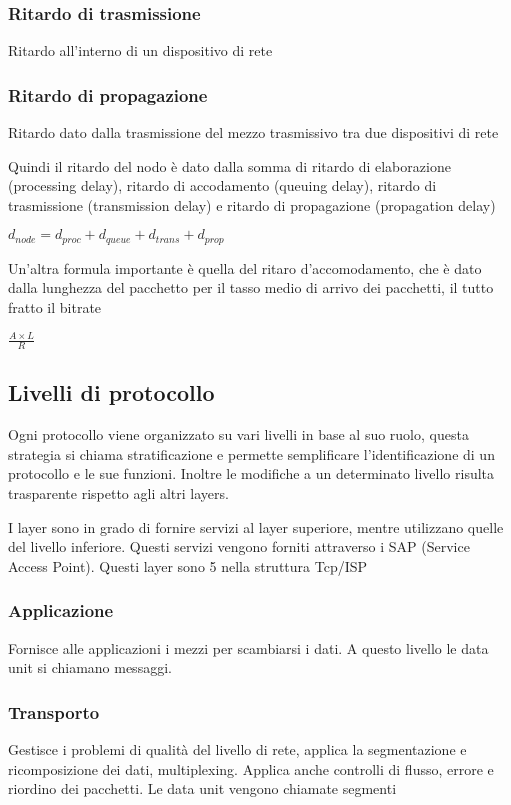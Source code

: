 \documentclass[12pt, a4paper]{article}
\begin{document}
\subsubsection*{Ritardo di trasmissione}
Ritardo all'interno di un dispositivo di rete

\subsubsection*{Ritardo di propagazione}
Ritardo dato dalla trasmissione del mezzo trasmissivo tra due dispositivi di rete


Quindi il ritardo del nodo è dato dalla somma di ritardo di elaborazione (processing delay), ritardo di accodamento 
(queuing delay), ritardo di trasmissione (transmission delay) e ritardo di propagazione (propagation delay)
\begin{center}
    $d_{node}=d_{proc}+d_{queue}+d_{trans}+d_{prop}$
\end{center}

Un'altra formula importante è quella del ritaro d'accomodamento, che è dato dalla lunghezza del pacchetto per il tasso 
medio di arrivo dei pacchetti, il tutto fratto il bitrate
\begin{center}
    $\frac{A\times L}{R}$
\end{center}

\subsection{Livelli di protocollo}
Ogni protocollo viene organizzato su vari livelli in base al suo ruolo, questa strategia si chiama stratificazione e 
permette semplificare l'identificazione di un protocollo e le sue funzioni. Inoltre le modifiche a un determinato 
livello risulta trasparente rispetto agli altri layers.

I layer sono in grado di fornire servizi al layer superiore, mentre utilizzano quelle del livello inferiore. Questi 
servizi vengono forniti attraverso i SAP (Service Access Point). Questi layer sono 5 nella struttura Tcp/ISP

\subsubsection*{Applicazione}
Fornisce alle applicazioni i mezzi per scambiarsi i dati. A questo livello le data unit si chiamano messaggi.
\subsubsection*{Transporto}
Gestisce i problemi di qualità del livello di rete, applica la segmentazione e ricomposizione dei dati, multiplexing. 
Applica anche controlli di flusso, errore e riordino dei pacchetti. Le data unit vengono chiamate segmenti
\end{document}
